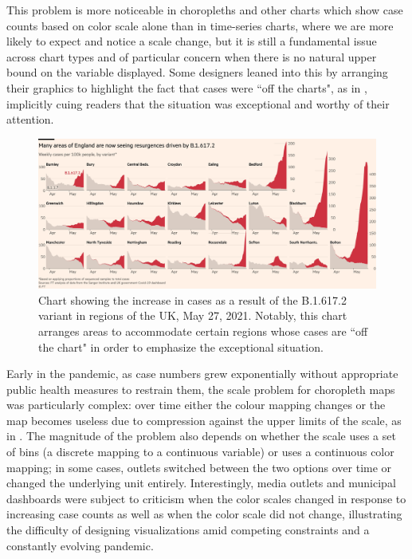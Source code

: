 \documentclass[article]{jdssv}\usepackage[]{graphicx}\usepackage[]{xcolor}
\begin{document}
This problem is more noticeable in choropleths and other charts which show case counts based on color scale alone than in time-series charts, where we are more likely to expect and notice a scale change, but it is still a fundamental issue across chart types and of particular concern when there is no natural upper bound on the variable displayed. 
Some designers leaned into this by arranging their graphics to highlight the fact that cases were ``off the charts", as in , implicitly cuing readers that the situation was exceptional and worthy of their attention.

\begin{figure}
\includegraphics[width=.99\linewidth]{ft-off-charts}
\caption{Chart showing the increase in cases as a result of the B.1.617.2 variant in regions of the UK, May 27, 2021. Notably, this chart arranges areas to accommodate certain regions whose cases are ``off the chart" in order to emphasize the exceptional situation. \citep{burn-murdochNEW1617Fuelling2021}}
\label{fig:jbm-tweet}
\end{figure}

Early in the pandemic, as case numbers grew exponentially without appropriate public health measures to restrain them, the scale problem for choropleth maps was particularly complex: over time either the colour mapping changes or the map becomes useless due to compression against the upper limits of the scale, as in \citet{panchadsaramIfWeAre2020}. 
The magnitude of the problem also depends on whether the scale uses a set of bins (a discrete mapping to a continuous variable) or uses a continuous color mapping; in some cases, outlets switched between the two options over time or changed the underlying unit entirely. 
Interestingly, media outlets and municipal dashboards were subject to criticism when the color scales changed in response to increasing case counts\citep{boeckDataVizDecisionmakingAction2020} as well as when the color scale did not change\citep{sandalowChiTribGraphicsPleaseUpdate2020}, illustrating the difficulty of designing visualizations amid competing constraints and a constantly evolving pandemic.
\end{document}
